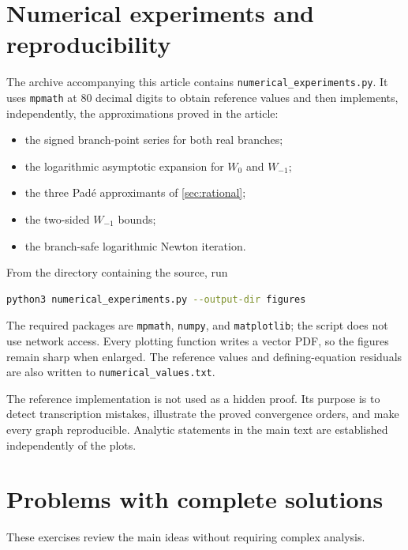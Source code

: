 \documentclass[11pt]{article}
\theoremstyle{remark}
\begin{document}
\section{Numerical experiments and reproducibility}\label{app:numerics}

The archive accompanying this article contains
\texttt{numerical\_experiments.py}.  It uses
\texttt{mpmath} at 80 decimal digits to obtain reference values and then
implements, independently, the approximations proved in the article:

\begin{itemize}
\item the signed branch-point series for both real branches;
\item the logarithmic asymptotic expansion for \(W_0\) and \(W_{-1}\);
\item the three Pad\'e approximants of \cref{sec:rational};
\item the two-sided \(W_{-1}\) bounds;
\item the branch-safe logarithmic Newton iteration.
\end{itemize}

From the directory containing the source, run
\begin{lstlisting}[language=bash]
python3 numerical_experiments.py --output-dir figures
\end{lstlisting}
The required packages are \texttt{mpmath}, \texttt{numpy}, and
\texttt{matplotlib}; the script does not use network access.  Every plotting
function writes a vector PDF, so the figures remain sharp when enlarged.
The reference values and defining-equation residuals are also written to
\texttt{numerical\_values.txt}.



The reference implementation is not used as a hidden proof.  Its purpose is
to detect transcription mistakes, illustrate the proved convergence orders,
and make every graph reproducible.  Analytic statements in the main text are
established independently of the plots.

\section{Problems with complete solutions}\label{app:problems}

These exercises review the main ideas without requiring complex analysis.
\end{document}
